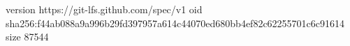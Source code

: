 version https://git-lfs.github.com/spec/v1
oid sha256:f44ab088a9a996b29fd397957a614c44070ed680bb4ef82c62255701c6c91614
size 87544

